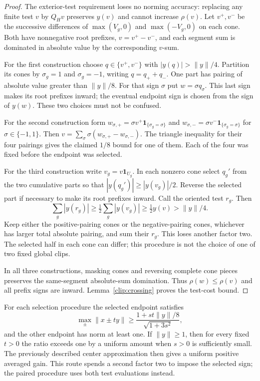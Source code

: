\begin{proof}
The exterior-test requirement loses no norming accuracy: replacing any
finite test $v$ by $Q_Hv$ preserves $y(v)$ and cannot increase $\rho(v)$.
Let $v^+,v^-$ be the successive differences of $\max(V_g,0)$ and
$\max(-V_g,0)$ on each cone. Both have nonnegative root prefixes,
$v=v^+-v^-$, and each segment sum is dominated in absolute value
by the corresponding $v$-sum.

For the first construction choose $q\in\{v^+,v^-\}$ with
$|y(q)|>\|y\|/4$. Partition its cones by $\sigma_g=1$ and
$\sigma_g=-1$, writing $q=q_++q_-$. One part has pairing of
absolute value greater than $\|y\|/8$. For that sign $\sigma$
put $w=\sigma q_\sigma$. This last sign makes its root prefixes
inward; the eventual endpoint sign is chosen from the sign of $y(w)$.
These two choices must not be confused.

For the second construction form
$w_{\sigma,+}=\sigma v^+\mathbf1_{\{\sigma_g=\sigma\}}$ and
$w_{\sigma,-}=\sigma v^-\mathbf1_{\{\sigma_g=\sigma\}}$ for
$\sigma\in\{-1,1\}$. Then
$v=\sum_\sigma\sigma(w_{\sigma,+}-w_{\sigma,-})$.
The triangle inequality for their four pairings gives the claimed
$1/8$ bound for one of them. Each of the four was fixed before the
endpoint was selected.

For the third construction write $v_g=v\mathbf1_{U_g}$. In each
nonzero cone select $q_g'$ from the two cumulative parts so that
$|y(q_g')|\ge|y(v_g)|/2$. Reverse the selected part if necessary
to make its root prefixes inward. Call the oriented test $r_g$.
Then
\[
 \sum_g|y(r_g)|\ge\tfrac12\sum_g|y(v_g)|
                    \ge\tfrac12y(v)>\|y\|/4.
\]
Keep either the positive-pairing cones or the negative-pairing cones,
whichever has larger total absolute pairing, and sum their $r_g$.
This loses another factor two. The selected half in each cone can
differ; this procedure is not the choice of one of two fixed global
clips.

In all three constructions, masking cones and reversing complete
cone pieces preserves the same-segment absolute-sum domination.
Thus $\rho(w)\le\rho(v)$ and all prefix signs are inward.
Lemma~\ref{clip:crossing} proves the test-cost bound.
\end{proof}

For each selection procedure the selected endpoint satisfies
\begin{equation}\label{clip:eighth-ratio}
 \max_\pm\|x\pm ty\|\ge
 \frac{1+st\|y\|/8}{\sqrt{1+3s^2}},
\end{equation}
and the other endpoint has norm at least one. If $\|y\|\ge1$, then for
every fixed $t>0$ the ratio exceeds one by a uniform amount when $s>0$
is sufficiently small. The previously
described center approximation then gives a uniform positive averaged
gain. This route spends a second factor two to impose the selected sign;
the paired procedure uses both test evaluations instead.

